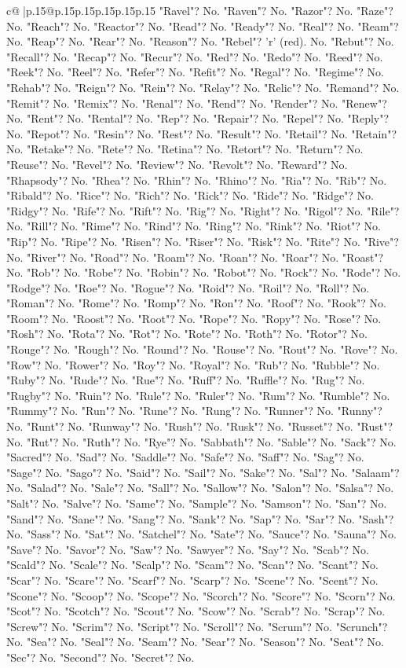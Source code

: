\documentclass{article}
\begin{document}
{\begin{supertabular}{c@{$\;$}|p{.15\linewidth}@{}p{.15\linewidth}p{.15\linewidth}p{.15\linewidth}p{.15\linewidth}p{.15\linewidth}}
{{{"Ravel"? No. "Raven"? No. "Razor"? No. "Raze"? No. "Reach"? No. "Reactor"? No. "Read"? No. "Ready"? No. "Real"? No. "Ream"? No. "Reap"? No. "Rear"? No. "Reason"? No. "Rebel"? 'r' (red). No. "Rebut"? No. "Recall"? No. "Recap"? No. "Recur"? No. "Red"? No. "Redo"? No. "Reed"? No. "Reek"? No. "Reel"? No. "Refer"? No. "Refit"? No. "Regal"? No. "Regime"? No. "Rehab"? No. "Reign"? No. "Rein"? No. "Relay"? No. "Relic"? No. "Remand"? No. "Remit"? No. "Remix"? No. "Renal"? No. "Rend"? No. "Render"? No. "Renew"? No. "Rent"? No. "Rental"? No. "Rep"? No. "Repair"? No. "Repel"? No. "Reply"? No. "Repot"? No. "Resin"? No. "Rest"? No. "Result"? No. "Retail"? No. "Retain"? No. "Retake"? No. "Rete"? No. "Retina"? No. "Retort"? No. "Return"? No. "Reuse"? No. "Revel"? No. "Review"? No. "Revolt"? No. "Reward"? No. "Rhapsody"? No. "Rhea"? No. "Rhin"? No. "Rhino"? No. "Ria"? No. "Rib"? No. "Ribald"? No. "Rice"? No. "Rich"? No. "Rick"? No. "Ride"? No. "Ridge"? No. "Ridgy"? No. "Rife"? No. "Rift"? No. "Rig"? No. "Right"? No. "Rigol"? No. "Rile"? No. "Rill"? No. "Rime"? No. "Rind"? No. "Ring"? No. "Rink"? No. "Riot"? No. "Rip"? No. "Ripe"? No. "Risen"? No. "Riser"? No. "Risk"? No. "Rite"? No. "Rive"? No. "River"? No. "Road"? No. "Roam"? No. "Roan"? No. "Roar"? No. "Roast"? No. "Rob"? No. "Robe"? No. "Robin"? No. "Robot"? No. "Rock"? No. "Rode"? No. "Rodge"? No. "Roe"? No. "Rogue"? No. "Roid"? No. "Roil"? No. "Roll"? No. "Roman"? No. "Rome"? No. "Romp"? No. "Ron"? No. "Roof"? No. "Rook"? No. "Room"? No. "Roost"? No. "Root"? No. "Rope"? No. "Ropy"? No. "Rose"? No. "Rosh"? No. "Rota"? No. "Rot"? No. "Rote"? No. "Roth"? No. "Rotor"? No. "Rouge"? No. "Rough"? No. "Round"? No. "Rouse"? No. "Rout"? No. "Rove"? No. "Row"? No. "Rower"? No. "Roy"? No. "Royal"? No. "Rub"? No. "Rubble"? No. "Ruby"? No. "Rude"? No. "Rue"? No. "Ruff"? No. "Ruffle"? No. "Rug"? No. "Rugby"? No. "Ruin"? No. "Rule"? No. "Ruler"? No. "Rum"? No. "Rumble"? No. "Rummy"? No. "Run"? No. "Rune"? No. "Rung"? No. "Runner"? No. "Runny"? No. "Runt"? No. "Runway"? No. "Rush"? No. "Rusk"? No. "Russet"? No. "Rust"? No. "Rut"? No. "Ruth"? No. "Rye"? No. "Sabbath"? No. "Sable"? No. "Sack"? No. "Sacred"? No. "Sad"? No. "Saddle"? No. "Safe"? No. "Saff"? No. "Sag"? No. "Sage"? No. "Sago"? No. "Said"? No. "Sail"? No. "Sake"? No. "Sal"? No. "Salaam"? No. "Salad"? No. "Sale"? No. "Sall"? No. "Sallow"? No. "Salon"? No. "Salsa"? No. "Salt"? No. "Salve"? No. "Same"? No. "Sample"? No. "Samson"? No. "San"? No. "Sand"? No. "Sane"? No. "Sang"? No. "Sank"? No. "Sap"? No. "Sar"? No. "Sash"? No. "Sass"? No. "Sat"? No. "Satchel"? No. "Sate"? No. "Sauce"? No. "Sauna"? No. "Save"? No. "Savor"? No. "Saw"? No. "Sawyer"? No. "Say"? No. "Scab"? No. "Scald"? No. "Scale"? No. "Scalp"? No. "Scam"? No. "Scan"? No. "Scant"? No. "Scar"? No. "Scare"? No. "Scarf"? No. "Scarp"? No. "Scene"? No. "Scent"? No. "Scone"? No. "Scoop"? No. "Scope"? No. "Scorch"? No. "Score"? No. "Scorn"? No. "Scot"? No. "Scotch"? No. "Scout"? No. "Scow"? No. "Scrab"? No. "Scrap"? No. "Screw"? No. "Scrim"? No. "Script"? No. "Scroll"? No. "Scrum"? No. "Scrunch"? No. "Sea"? No. "Seal"? No. "Seam"? No. "Sear"? No. "Season"? No. "Seat"? No. "Sec"? No. "Second"? No. "Secret"? No. }}}
\end{supertabular}}
\end{document}
